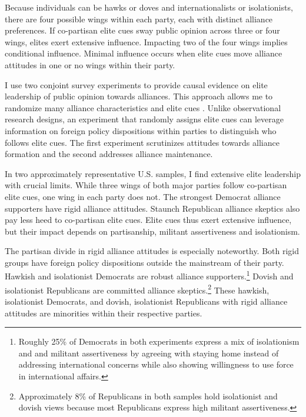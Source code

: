 \documentclass[12pt]{article}
\begin{document}
Because individuals can be hawks or doves and internationalists or isolationists, there are four possible wings within each party, each with distinct alliance preferences. 
If co-partisan elite cues sway public opinion across three or four wings, elites exert extensive influence. 
Impacting two of the four wings implies conditional influence. 
Minimal influence occurs when elite cues move alliance attitudes in one or no wings within their party.


I use two conjoint survey experiments to provide causal evidence on elite leadership of public opinion towards alliances.
This approach allows me to randomize many alliance characteristics and elite cues \citep{Hainmuelleretal2014}.
Unlike observational research designs, an experiment that randomly assigns elite cues can leverage information on foreign policy dispositions within parties to distinguish who follows elite cues. 
The first experiment scrutinizes attitudes towards alliance formation and the second addresses alliance maintenance. 


In two approximately representative U.S. samples, I find extensive elite leadership with crucial limits. 
While three wings of both major parties follow co-partisan elite cues, one wing in each party does not.
The strongest Democrat alliance supporters have rigid alliance attitudes.
Staunch Republican alliance skeptics also pay less heed to co-partisan elite cues. 
Elite cues thus exert extensive influence, but their impact depends on partisanship, militant assertiveness and isolationism.


The partisan divide in rigid alliance attitudes is especially noteworthy.
Both rigid groups have foreign policy dispositions outside the mainstream of their party. 
Hawkish and isolationist Democrats are robust alliance supporters.\footnote{Roughly 25\% of Democrats in both experiments express a mix of isolationism and and militant assertiveness by agreeing with staying home instead of addressing international concerns while also showing willingness to use force in international affairs.}
Dovish and isolationist Republicans are committed alliance skeptics.\footnote{Approximately 8\% of Republicans in both samples hold isolationist and dovish views because most Republicans express high militant assertiveness.} 
These hawkish, isolationist Democrats, and dovish, isolationist Republicans with rigid alliance attitudes are minorities within their respective parties. 
\end{document}
